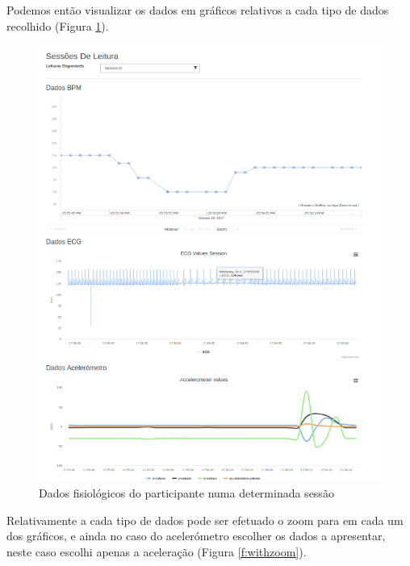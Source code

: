 Podemos então visualizar os dados em gráficos relativos a cada tipo de dados recolhido (Figura \ref{f:leiturasdados}). 

\begin{figure}[H]
\centering
\includegraphics[width=1\textwidth]{imgs/dadosfisiologicos-web.png}
\caption[Dados fisiológicos do participante numa determinada sessão]{Dados fisiológicos do participante numa determinada sessão}
\label{f:leiturasdados}
\end{figure}
 Relativamente a cada tipo de dados pode ser efetuado o zoom para em cada um dos gráficos, e ainda no caso do acelerómetro escolher os dados a apresentar, neste caso escolhi apenas a aceleração (Figura \ref{f:withzoom}).
 
